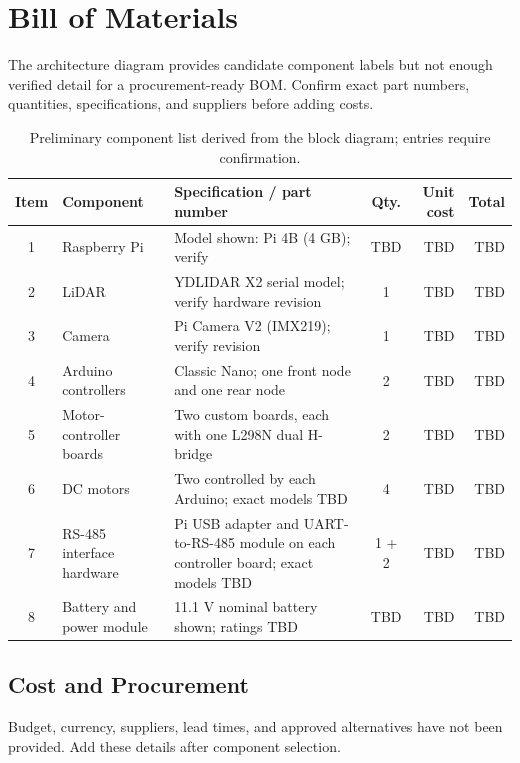 \section{Bill of Materials}

The architecture diagram provides candidate component labels but not enough verified detail for a procurement-ready BOM. Confirm exact part numbers, quantities, specifications, and suppliers before adding costs.

\begin{table}[!htbp]
    \centering
    \small
    \renewcommand{\arraystretch}{1.3}
    \begin{tabular}{clp{5.4cm}crr}
        \toprule
        \textbf{Item} & \textbf{Component} & \textbf{Specification / part number} & \textbf{Qty.} & \textbf{Unit cost} & \textbf{Total} \\
        \midrule
        1 & Raspberry Pi & Model shown: Pi 4B (4 GB); verify & TBD & TBD & TBD \\
        2 & LiDAR & YDLIDAR X2 serial model; verify hardware revision & 1 & TBD & TBD \\
        3 & Camera & Pi Camera V2 (IMX219); verify revision & 1 & TBD & TBD \\
        4 & Arduino controllers & Classic Nano; one front node and one rear node & 2 & TBD & TBD \\
        5 & Motor-controller boards & Two custom boards, each with one L298N dual H-bridge & 2 & TBD & TBD \\
        6 & DC motors & Two controlled by each Arduino; exact models TBD & 4 & TBD & TBD \\
        7 & RS-485 interface hardware & Pi USB adapter and UART-to-RS-485 module on each controller board; exact models TBD & 1 + 2 & TBD & TBD \\
        8 & Battery and power module & 11.1 V nominal battery shown; ratings TBD & TBD & TBD & TBD \\
        \bottomrule
    \end{tabular}
    \caption{Preliminary component list derived from the block diagram; entries require confirmation.}
\end{table}

\subsection{Cost and Procurement}
Budget, currency, suppliers, lead times, and approved alternatives have not been provided. Add these details after component selection.
